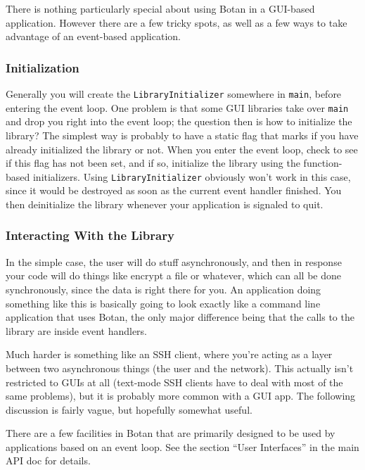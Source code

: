 \documentclass{article}
\newcommand{\type}[1]{\texttt{#1}}
\begin{document}
There is nothing particularly special about using Botan in a GUI-based
application. However there are a few tricky spots, as well as a few ways to
take advantage of an event-based application.

\subsubsection{Initialization}

Generally you will create the \type{LibraryInitializer} somewhere in
\texttt{main}, before entering the event loop. One problem is that some GUI
libraries take over \texttt{main} and drop you right into the event loop; the
question then is how to initialize the library? The simplest way is probably to
have a static flag that marks if you have already initialized the library or
not. When you enter the event loop, check to see if this flag has not been set,
and if so, initialize the library using the function-based initializers. Using
\type{LibraryInitializer} obviously won't work in this case, since it would be
destroyed as soon as the current event handler finished. You then deinitialize
the library whenever your application is signaled to quit.

\subsubsection{Interacting With the Library}

In the simple case, the user will do stuff asynchronously, and then in response
your code will do things like encrypt a file or whatever, which can all be done
synchronously, since the data is right there for you. An application doing
something like this is basically going to look exactly like a command line
application that uses Botan, the only major difference being that the calls to
the library are inside event handlers.

Much harder is something like an SSH client, where you're acting as a layer
between two asynchronous things (the user and the network). This actually isn't
restricted to GUIs at all (text-mode SSH clients have to deal with most of the
same problems), but it is probably more common with a GUI app. The following
discussion is fairly vague, but hopefully somewhat useful.

There are a few facilities in Botan that are primarily designed to be used by
applications based on an event loop. See the section ``User Interfaces'' in the
main API doc for details.
\end{document}

